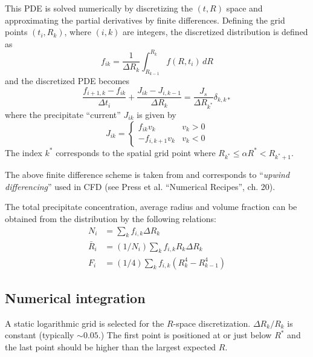 \documentclass[12pt,a4paper]{article}
\begin{document}
This PDE is solved numerically by discretizing the $(t,R)$ space and approximating the partial derivatives by finite differences. Defining the grid points $(t_i, R_k)$, where $(i,k)$ are integers, the discretized distribution is defined as
\begin{equation}
f_{ik} = \frac{1}{\Delta R_k} \int_{R_{k-1}}^{R_k}f(R,t_i)\,dR
\end{equation}
and the discretized PDE becomes
\begin{equation}
\label{PDE}
\frac{f_{i+1,k} - f_{ik}}{\Delta t_i} + \frac{J_{ik} - J_{i,k-1}}{\Delta R_k} = \frac{J_s}{\Delta R_{k^*}} \delta_{k,k*}
\end{equation}
where the precipitate ``current'' $J_{ik}$ is given by
\begin{equation} 
J_{ik} = 
\begin{cases}
f_{ik}v_k & v_k>0 \\
-f_{i,k+1}v_k & v_k<0
\end{cases}
\end{equation}
The index $k^*$ corresponds to the spatial grid point where $R_{k^*} \leq \alpha R^* < R_{k^*+1}$. 

The above finite difference scheme is taken from \citet{Myhr-2000-Modellingofnon-iso} and corresponds to ``\textit{upwind differencing}'' used in CFD (see Press et al. ``Numerical Recipes'', ch. 20).

The total precipitate concentration, average radius and volume fraction can be obtained from the distribution by the following relations:
\begin{subequations}
	\begin{align}
N_i &= \sum_k { f_{i,k} \Delta R_k } \\
\bar{R}_i &= (1/ N_i) \sum_k { f_{i,k} R_k \Delta R_k }  \\
F_i &= (1/ 4) \sum_k { f_{i,k} (R_k^4-R_{k-1}^4 )  } 
	\end{align}
\end{subequations}


\subsection{Numerical integration}

A static logarithmic grid is selected for the $R$-space discretization. $\Delta R_k / R_k$ is constant (typically $\sim 0.05$.) The first point is positioned at or just below $R^*$ and the last point should be higher than the largest expected $R$. 
\end{document}
